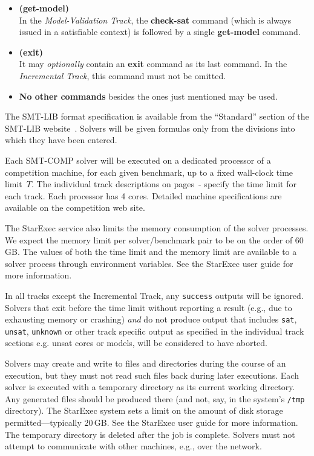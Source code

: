 \documentclass[12pt]{article}
\newcommand{\akey}[1]{\textbf{#1}\xspace}
\newcommand{\bkey}[1]{\textbf{{#1}}\xspace}
\newcommand{\inctrack}{Incremental Track\xspace}
\newcommand{\ucoretrack}{Unsat-Core Track\xspace}
\newcommand{\mvaltrack}{Model-Validation Track\xspace}
\begin{document}
\begin{itemize}
      In the \emph{\ucoretrack}, the \akey{check-sat} command (which is
      always issued in an unsatisfiable context) is followed by a single
      \akey{get-unsat-core} command.
    \item \bkey{(get-model)}\\
      In the \emph{\mvaltrack}, the \akey{check-sat} command (which is
      always issued in a satisfiable context) is followed by a single
    \akey{get-model} command.
  \item \bkey{(exit)}\\
    It may \emph{optionally} contain an \akey{exit} command as its
    last command.  In the \emph{\inctrack}, this command must not be
    omitted.
  \item \textbf{No other commands} besides the ones just mentioned may be used.
\end{itemize}
%
The SMT-LIB format specification is available from the ``Standard''
section of the SMT-LIB website~\cite{SMT-LIB}.  Solvers will be given
formulas only from the divisions into which they have been entered.

\pagebreak
{}
%
Each SMT-COMP solver will be executed on a dedicated processor of a
competition machine, for each given benchmark, up to a fixed
wall-clock time limit~$T$. The individual track descriptions on
pages~\pageref{sec:exec:single}-\pageref{sec:exec:model} specify
the time limit for each track. Each processor has 4 cores.  Detailed
machine specifications are available on the competition web site.

The StarExec service also limits the memory consumption of the solver
processes.  We expect the memory limit per solver/benchmark pair to be
on the order of 60\,GB.  The values of both the time limit and the
memory limit are available to a solver process through environment
variables.  See the StarExec user guide for more information.

%
In all tracks except the \inctrack, any \texttt{success} outputs will be
ignored.  Solvers that exit before the time limit without reporting a result
(e.g., due to exhausting memory or crashing) \emph{and} do not produce output
that includes \texttt{sat}, \texttt{unsat}, \texttt{unknown} or other track
specific output as specified in the individual track sections e.g. unsat cores
or models, will be considered to have aborted.

%
Solvers may create and write to files and directories during the
course of an execution, but they must not read such files back during
later executions.  Each solver is executed with a temporary directory
as its current working directory.  Any generated files should be
produced there (and not, say, in the system's \texttt{/tmp}
directory).  The StarExec system sets a limit on the amount of disk
storage permitted---typically 20\,GB.  See the StarExec user guide for
more information.  The temporary directory is deleted after the job is
complete.  Solvers must not attempt to communicate with other
machines, e.g., over the network.
\end{document}
